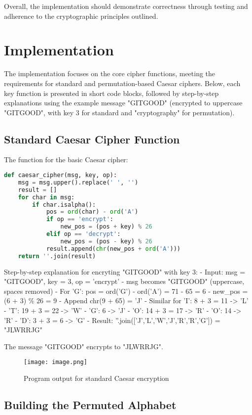 Overall, the implementation should demonstrate correctness through testing and adherence to the cryptographic principles outlined.

\section{Implementation}

The implementation focuses on the core cipher functions, meeting the requirements for standard and permutation-based Caesar ciphers. Below, each key function is presented in short code blocks, followed by step-by-step explanations using the example message "GITGOOD" (encrypted to uppercase "GITGOOD", with key 3 for standard and "cryptography" for permutation).

\subsection{Standard Caesar Cipher Function}

The function for the basic Caesar cipher:

\begin{lstlisting}[language=Python]
def caesar_cipher(msg, key, op):
    msg = msg.upper().replace(' ', '')
    result = []
    for char in msg:
        if char.isalpha():
            pos = ord(char) - ord('A')
            if op == 'encrypt':
                new_pos = (pos + key) % 26
            elif op == 'decrypt':
                new_pos = (pos - key) % 26
            result.append(chr(new_pos + ord('A')))
    return ''.join(result)
\end{lstlisting}

Step-by-step explanation for encryting "GITGOOD" with key 3:
- Input: msg = "GITGOOD", key = 3, op = 'encrypt'
- msg becomes "GITGOOD" (uppercase, spaces removed)
- For 'G': pos = ord('G') - ord('A') = 71 - 65 = 6
- new\_pos = (6 + 3) \% 26 = 9
- Append chr(9 + 65) = 'J'
- Similar for 'I': 8 + 3 = 11 -> 'L'
- 'T': 19 + 3 = 22 -> 'W'
- 'G': 6 -> 'J'
- 'O': 14 + 3 = 17 -> 'R'
- 'O': 14 -> 'R'
- 'D': 3 + 3 = 6 -> 'G'
- Result: ''.join(['J','L','W','J','R','R','G']) = "JLWRRJG"

The message "GITGOOD" encrypts to "JLWRRJG".

\begin{figure}[h]
\centering
\texttt{[image: image.png]}
\caption{Program output for standard Caesar encryption}
\end{figure}

\subsection{Building the Permuted Alphabet}

